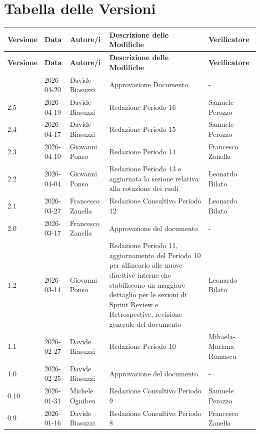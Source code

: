 \documentclass[a4paper, 11pt, oneside]{scrartcl} %
\begin{document}
\section*{Tabella delle Versioni}
\vspace{0.2cm}
{%
\renewcommand{\arraystretch}{1.2}
\setlength{\LTleft}{-0.4cm}
\setlength{\LTright}{0pt}
\begin{longtable}{@{}llp{}p{}p{}@{}}
    \toprule
    \textbf{Versione} & \textbf{Data} & \textbf{Autore/i} & \textbf{Descrizione delle Modifiche} & \textbf{Verificatore} \\
    \midrule
    \endfirsthead
    \toprule
    \textbf{Versione} & \textbf{Data} & \textbf{Autore/i} & \textbf{Descrizione delle Modifiche} & \textbf{Verificatore} \\
    \midrule
    \endhead
    \bottomrule
    \endfoot
    \bottomrule
    \endlastfoot
3.0 & 2026-04-20 & Davide Biasuzzi & Approvazione Documento & - \\
2.5 & 2026-04-19 & Davide Biasuzzi & Redazione Periodo 16 & Samuele Perozzo \\
2.4 & 2026-04-17 & Davide Biasuzzi & Redazione Periodo 15 & Samuele Perozzo \\
2.3 & 2026-04-10 & Giovanni Ponso & Redazione Periodo 14 & Francesco Zanella \\
2.2 & 2026-04-04 & Giovanni Ponso & Redazione Periodo 13 e aggiornata la sezione relativa alla rotazione dei ruoli & Leonardo Bilato \\
2.1 & 2026-03-27 & Francesco Zanella & Redazione Consultivo Periodo 12 & Leonardo Bilato \\
2.0 & 2026-03-17 & Francesco Zanella & Approvazione del documento & - \\
1.2 & 2026-03-14 & Giovanni Ponso & Redazione Periodo 11, aggiornamento del Periodo 10 per allinearlo alle nuove direttive interne che stabiliscono un maggiore dettaglio per le sezioni di Sprint Review e Retrospective, revisione generale del documento & Leonardo Bilato \\
1.1 & 2026-02-27 & Davide Biasuzzi & Redazione Periodo 10 & Mihaela-Mariana Romascu \\
1.0 & 2026-02-25 & Davide Biasuzzi & Approvazione del documento & - \\
0.10 & 2026-01-31 & Michele Ogniben & Redazione Consultivo Periodo 9 & Samuele Perozzo \\
0.9 & 2026-01-16 & Davide Biasuzzi & Redazione Consultivo Periodo 8 & Francesco Zanella \\

\end{longtable}}
\end{document}
